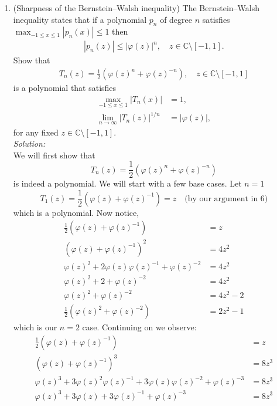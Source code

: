 \documentclass[10pt]{amsart}
\theoremstyle{nonumberplain}
\begin{document}
\begin{enumerate}[label={\bf {\arabic*}:}]
   \item (Sharpness of the Bernstein--Walsh inequality)  The
     Bernstein--Walsh inequality states that if a polynomial $p_n$ of
     degree $n$ satisfies $\max_{-1 \leq x \leq 1} |p_n(x)| \leq 1$
     then
     \begin{align*}
       |p_n(z)| \leq |\varphi(z)|^n, \quad z \in \mathbb C \setminus [-1,1].
     \end{align*}
     Show that
     \begin{align*}
        T_n(z) = \frac 1 2 \left( \varphi(z)^n + \varphi(z)^{-n}
       \right), \quad z \in \mathbb C \setminus [-1,1]
     \end{align*}
     is a polynomial that satisfies
     \begin{align*}
       \max_{-1 \leq x \leq 1} |T_n(x)| &= 1,\\
       \lim_{n \to \infty} |T_n(z)|^{1/n} &= |\varphi(z)|,
     \end{align*}
     for any fixed $z \in \mathbb C \setminus [-1,1]$. \\
\textit{Solution:} \\
We will first show that $$T_n(z) = \frac 1 2 \left( \varphi(z)^n + \varphi(z)^{-n} \right)$$ is indeed a polynomial.
We will start with a few base cases. Let $n = 1$
$$T_1(z) = \frac 1 2 \left( \varphi(z) + \varphi(z)^{-1} \right) = z \quad \text{(by our argument in 6)}$$
which is a polynomial. Now notice,
\begin{align*}
\frac 1 2 \left( \varphi(z) + \varphi(z)^{-1} \right) &= z \\
\left( \varphi(z) + \varphi(z)^{-1} \right)^2 &= 4z^2 \\
\varphi(z)^2 + 2\varphi(z)\varphi(z)^{-1} + \varphi(z)^{-2} &= 4z^2 \\
\varphi(z)^2 + 2 + \varphi(z)^{-2} &= 4z^2 \\
\varphi(z)^2 + \varphi(z)^{-2} &= 4z^2 - 2 \\
\frac 1 2 \left(\varphi(z)^2 + \varphi(z)^{-2}\right) &= 2z^2 - 1
\end{align*}
which is our $n = 2$ case. Continuing on we observe:
\begin{align*}
\frac 1 2 \left( \varphi(z) + \varphi(z)^{-1} \right) &= z \\
\left( \varphi(z) + \varphi(z)^{-1} \right)^3 &= 8z^3 \\
\varphi(z)^3 + 3\varphi(z)^2\varphi(z)^{-1} + 3\varphi(z)\varphi(z)^{-2} + \varphi(z)^{-3} &= 8z^3 \\
\varphi(z)^3 + 3\varphi(z) + 3\varphi(z)^{-1} + \varphi(z)^{-3} &= 8z^3 \\

\end{align*}
\end{enumerate}
\end{document}
